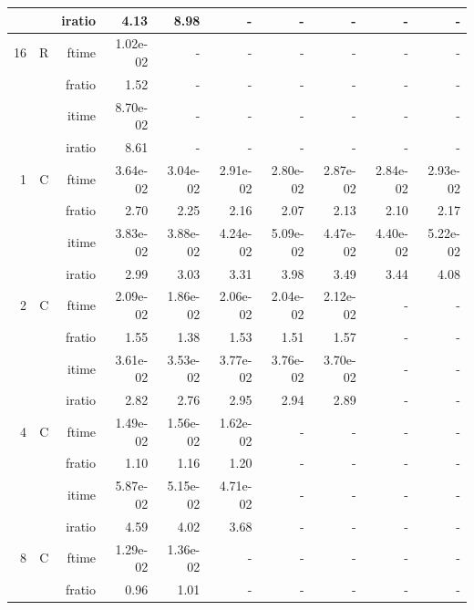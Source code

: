 \documentclass[a4paper]{article}
\begin{document}
\begin{table}[htbp]
\begin{center}
\begin{small}
\begin{tabular}{|r|r|r|r|r|r|r|r|r|r|}
          &      & iratio & 4.13 & 8.98 &     -     &     -     &     -     &     -     &     -     \\ \hline 
     16 & R & ftime & 1.02e-02 &     -     &     -     &     -     &     -     &     -     &     -     \\   
          &      & fratio & 1.52 &     -     &     -     &     -     &     -     &     -     &     -     \\   
          &      & itime & 8.70e-02 &     -     &     -     &     -     &     -     &     -     &     -     \\   
          &      & iratio & 8.61 &     -     &     -     &     -     &     -     &     -     &     -     \\ \hline\hline
     1 & C & ftime & 3.64e-02 & 3.04e-02 & 2.91e-02 & 2.80e-02 & 2.87e-02 & 2.84e-02 & 2.93e-02 \\   
          &      & fratio & 2.70 & 2.25 & 2.16 & 2.07 & 2.13 & 2.10 & 2.17 \\   
          &      & itime & 3.83e-02 & 3.88e-02 & 4.24e-02 & 5.09e-02 & 4.47e-02 & 4.40e-02 & 5.22e-02 \\   
          &      & iratio & 2.99 & 3.03 & 3.31 & 3.98 & 3.49 & 3.44 & 4.08 \\ \hline 
     2 & C & ftime & 2.09e-02 & 1.86e-02 & 2.06e-02 & 2.04e-02 & 2.12e-02 &     -     &     -     \\   
          &      & fratio & 1.55 & 1.38 & 1.53 & 1.51 & 1.57 &     -     &     -     \\   
          &      & itime & 3.61e-02 & 3.53e-02 & 3.77e-02 & 3.76e-02 & 3.70e-02 &     -     &     -     \\   
          &      & iratio & 2.82 & 2.76 & 2.95 & 2.94 & 2.89 &     -     &     -     \\ \hline 
     4 & C & ftime & 1.49e-02 & 1.56e-02 & 1.62e-02 &     -     &     -     &     -     &     -     \\   
          &      & fratio & 1.10 & 1.16 & 1.20 &     -     &     -     &     -     &     -     \\   
          &      & itime & 5.87e-02 & 5.15e-02 & 4.71e-02 &     -     &     -     &     -     &     -     \\   
          &      & iratio & 4.59 & 4.02 & 3.68 &     -     &     -     &     -     &     -     \\ \hline 
     8 & C & ftime & 1.29e-02 & 1.36e-02 &     -     &     -     &     -     &     -     &     -     \\   
          &      & fratio & 0.96 & 1.01 &     -     &     -     &     -     &     -     &     -     \\   

\end{tabular}
\end{small}
\end{center}
\end{table}
\end{document}
